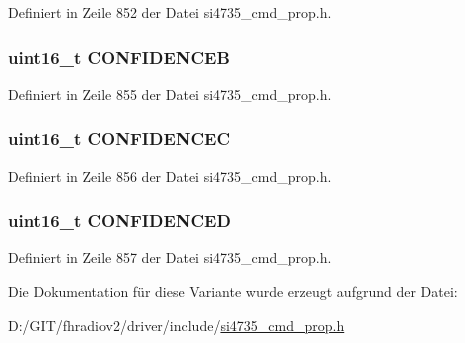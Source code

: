 Definiert in Zeile 852 der Datei si4735\+\_\+cmd\+\_\+prop.\+h.

\hypertarget{unionfm__blend__rssi__mono__thres_ad50cf40b7308de47174d7172846def72}{}
\subsubsection[{C\+O\+N\+F\+I\+D\+E\+N\+C\+E\+B}]{\setlength{\rightskip}{0pt plus 5cm}uint16\+\_\+t C\+O\+N\+F\+I\+D\+E\+N\+C\+E\+B}\label{unionfm__blend__rssi__mono__thres_ad50cf40b7308de47174d7172846def72}


Definiert in Zeile 855 der Datei si4735\+\_\+cmd\+\_\+prop.\+h.

\hypertarget{unionfm__blend__rssi__mono__thres_ab0a4bcb0b2e578ddbbbc4e33767a7df2}{}
\subsubsection[{C\+O\+N\+F\+I\+D\+E\+N\+C\+E\+C}]{\setlength{\rightskip}{0pt plus 5cm}uint16\+\_\+t C\+O\+N\+F\+I\+D\+E\+N\+C\+E\+C}\label{unionfm__blend__rssi__mono__thres_ab0a4bcb0b2e578ddbbbc4e33767a7df2}


Definiert in Zeile 856 der Datei si4735\+\_\+cmd\+\_\+prop.\+h.

\hypertarget{unionfm__blend__rssi__mono__thres_af81bc38f41af0228eb6a646489ad2e3a}{}
\subsubsection[{C\+O\+N\+F\+I\+D\+E\+N\+C\+E\+D}]{\setlength{\rightskip}{0pt plus 5cm}uint16\+\_\+t C\+O\+N\+F\+I\+D\+E\+N\+C\+E\+D}\label{unionfm__blend__rssi__mono__thres_af81bc38f41af0228eb6a646489ad2e3a}


Definiert in Zeile 857 der Datei si4735\+\_\+cmd\+\_\+prop.\+h.



Die Dokumentation für diese Variante wurde erzeugt aufgrund der Datei\+:\begin{DoxyCompactItemize}
\item 
D\+:/\+G\+I\+T/fhradiov2/driver/include/\hyperlink{si4735__cmd__prop_8h}{si4735\+\_\+cmd\+\_\+prop.\+h}\end{DoxyCompactItemize}
